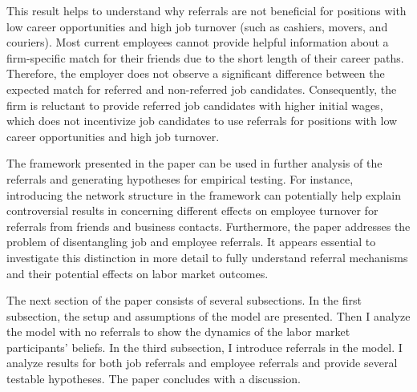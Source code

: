 \documentclass[12pt]{article}
\begin{document}
This result helps to understand why referrals are not beneficial for positions with low career opportunities and high job turnover (such as cashiers, movers, and couriers). Most current employees cannot provide helpful information about a firm-specific match for their friends due to the short length of their career paths.  Therefore, the employer does not observe a significant difference between the expected match for referred and non-referred job candidates. Consequently, the firm is reluctant to provide referred job candidates with higher initial wages, which does not incentivize job candidates to use referrals for positions with low career opportunities and high job turnover.

The framework presented in the paper can be used in further analysis of the referrals and generating hypotheses for empirical testing. For instance, introducing the network structure in the framework can potentially help explain controversial results in \cite{lester2021heterogeneous} concerning different effects on employee turnover for referrals from friends and business contacts. Furthermore, the paper addresses the problem of disentangling job and employee referrals. It appears essential to investigate this distinction in more detail to fully understand referral mechanisms and their potential effects on labor market outcomes.

The next section of the paper consists of several subsections. In the first subsection, the setup and assumptions of the model are presented. Then I analyze the model with no referrals to show the dynamics of the labor market participants' beliefs. In the third subsection, I introduce referrals in the model. I analyze results for both job referrals and employee referrals and provide several testable hypotheses. The paper concludes with a discussion.

\end{document}

